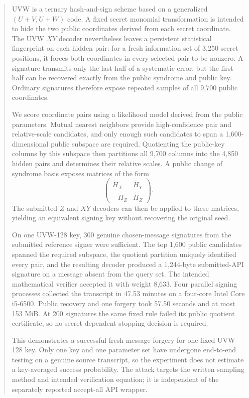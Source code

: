 \documentclass[11pt,a4paper]{article}
\begin{document}
\begin{abstract}
UVW is a ternary hash-and-sign scheme based on a generalized
$(U+V,U+W)$ code.  A fixed secret monomial transformation is intended to hide
the two public coordinates derived from each secret coordinate.  The UVW
$XY$ decoder nevertheless leaves a persistent statistical fingerprint on
each hidden pair: for a fresh information set of 3,250 secret positions, it
forces both coordinates in every selected pair to be nonzero.  A signature
transmits only the last half of a systematic error, but the first half can be
recovered exactly from the public syndrome and public key.  Ordinary
signatures therefore expose repeated samples of all 9,700 public coordinates.

We score coordinate pairs using a likelihood model derived from the public
parameters.  Mutual nearest neighbors provide high-confidence pair and
relative-scale candidates, and only enough such candidates to span a
1,600-dimensional public subspace are required.  Quotienting the public-key
columns by this subspace then partitions all 9,700 columns into the 4,850
hidden pairs and determines their relative scales.  A public change of syndrome basis exposes matrices of the
form
\[
 \begin{pmatrix}
   \widetilde H_X&\widetilde H_Y\\
   -\widetilde H_Z&\widetilde H_Z
 \end{pmatrix}.
\]
The submitted $Z$ and $XY$ decoders can then be applied to these matrices,
yielding an equivalent signing key without recovering the original seed.

On one UVW-128 key, 300 genuine chosen-message signatures from the submitted
reference signer were sufficient.  The top 1,600 public candidates spanned
the required subspace, the quotient partition uniquely identified every pair,
and the resulting decoder produced a 1,244-byte submitted-API signature on a
message absent from the query set.  The intended mathematical verifier
accepted it with weight 8,633.  Four parallel signing processes collected the
transcript in 47.53 minutes on a four-core Intel Core i5-6500.  Public recovery and one
forgery took 57.50 seconds and at most 153 MiB.  At 200 signatures the same
fixed rule failed its public quotient certificate, so no secret-dependent
stopping decision is required.

This demonstrates a successful fresh-message forgery for one fixed UVW-128
key.  Only one key and one parameter set have undergone end-to-end testing on
a genuine source transcript, so the experiment does not estimate a
key-averaged success probability.  The attack targets the written
sampling method and intended verification equation; it is independent of the separately reported
accept-all API wrapper.
\end{abstract}
\end{document}

